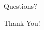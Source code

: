 \documentclass[aspectratio=169,12pt]{beamer}
\begin{document}
\begin{frame}
    \begin{center}
    {\Huge Questions?}
    
    \vspace{1cm}
    {\Large Thank You!}
    \end{center}
\end{frame}
\end{document}
